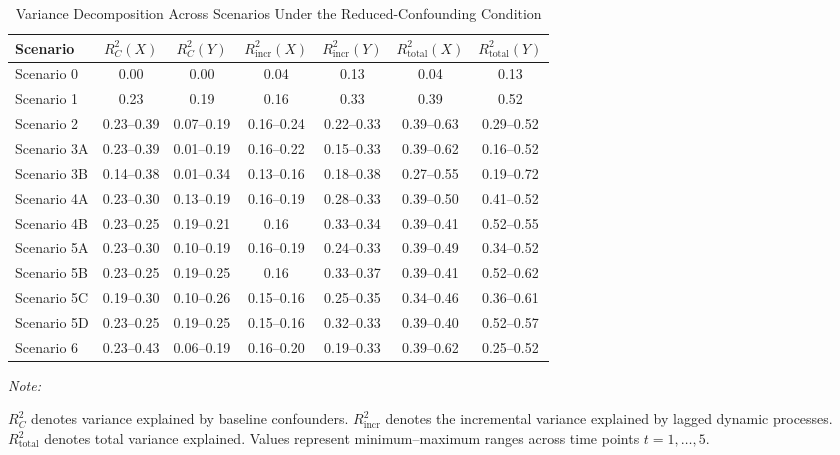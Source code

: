 \begin{table}[!h]
\centering
\caption{\label{tab:R2_reduced}Variance Decomposition Across Scenarios Under the Reduced-Confounding Condition}
\centering
\fontsize{10}{12}\selectfont
\begin{threeparttable}
\begin{tabular}[t]{lcccccc}
\toprule
Scenario & $R_C^2(X)$ & $R_C^2(Y)$ & $R_{\text{incr}}^2(X)$ & $R_{\text{incr}}^2(Y)$ & $R_{\text{total}}^2(X)$ & $R_{\text{total}}^2(Y)$\\
\midrule
Scenario 0 & 0.00 & 0.00 & 0.04 & 0.13 & 0.04 & 0.13\\
Scenario 1 & 0.23 & 0.19 & 0.16 & 0.33 & 0.39 & 0.52\\
Scenario 2 & 0.23--0.39 & 0.07--0.19 & 0.16--0.24 & 0.22--0.33 & 0.39--0.63 & 0.29--0.52\\
Scenario 3A & 0.23--0.39 & 0.01--0.19 & 0.16--0.22 & 0.15--0.33 & 0.39--0.62 & 0.16--0.52\\
Scenario 3B & 0.14--0.38 & 0.01--0.34 & 0.13--0.16 & 0.18--0.38 & 0.27--0.55 & 0.19--0.72\\
\addlinespace
Scenario 4A & 0.23--0.30 & 0.13--0.19 & 0.16--0.19 & 0.28--0.33 & 0.39--0.50 & 0.41--0.52\\
Scenario 4B & 0.23--0.25 & 0.19--0.21 & 0.16 & 0.33--0.34 & 0.39--0.41 & 0.52--0.55\\
Scenario 5A & 0.23--0.30 & 0.10--0.19 & 0.16--0.19 & 0.24--0.33 & 0.39--0.49 & 0.34--0.52\\
Scenario 5B & 0.23--0.25 & 0.19--0.25 & 0.16 & 0.33--0.37 & 0.39--0.41 & 0.52--0.62\\
Scenario 5C & 0.19--0.30 & 0.10--0.26 & 0.15--0.16 & 0.25--0.35 & 0.34--0.46 & 0.36--0.61\\
\addlinespace
Scenario 5D & 0.23--0.25 & 0.19--0.25 & 0.15--0.16 & 0.32--0.33 & 0.39--0.40 & 0.52--0.57\\
Scenario 6 & 0.23--0.43 & 0.06--0.19 & 0.16--0.20 & 0.19--0.33 & 0.39--0.62 & 0.25--0.52\\
\bottomrule
\end{tabular}
\begin{tablenotes}
\item \textit{Note: } 
\item $R_C^2$ denotes variance explained by baseline confounders. $R_{\text{incr}}^2$ denotes the incremental variance explained by lagged dynamic processes. $R_{\text{total}}^2$ denotes total variance explained. Values represent minimum--maximum ranges across time points $t = 1, \dots, 5$.
\end{tablenotes}
\end{threeparttable}
\end{table}
